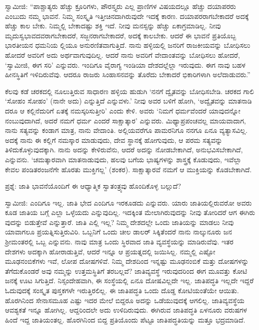 ಸ್ವಾಮೀಜಿ: “ಪಾಶ್ಚಾತ್ಯರು ಹೆಚ್ಚು ಕ್ರೂರಿಗಳು, ಪೌರಸ್ತ್ಯರು ಎಲ್ಲ ಪ್ರಾಣಿಗಳ ವಿಷಯದಲ್ಲೂ ಹೆಚ್ಚು ದಯಾಪರರು ಎಂಬುದು ನಮ್ಮ ಭಾವನೆ. ನಿಮ್ಮ ಸಂಸ್ಕೃತಿ ಇತ್ತೀಚಿನದಾಗಿರುವುದೇ ಇದಕ್ಕೆ ಕಾರಣ. ದಯಾಪರರಾಗಬೇಕಾದರೆ ಅದಕ್ಕೆ ಹೆಚ್ಚು ಕಾಲ ಬೇಕು. ನಿಮ್ಮಲ್ಲಿ ಬೇಕಾದಷ್ಟು ಶಕ್ತಿ ಇದೆ. ನೀವು ಮನಸ್ಸನ್ನು ಹೆಚ್ಚು ಏಕಾಗ್ರಮಾಡಿಲ್ಲ. ನೀವು ಮೃದುಸ್ವಭಾವದವರಾಗಬೇಕಾದರೆ, ಸಜ್ಜನರಾಗಬೇಕಾದರೆ, ಅದಕ್ಕೆ ಕಾಲಬೇಕು. ಆದರೆ ಈ ಭಾವನೆ ಪ್ರತಿಯೊಬ್ಬ ಭಾರತೀಯನ ಧಮನಿಯ ಲ್ಲಿಯೂ ಅನುರಣಿತವಾಗುತ್ತಿದೆ. ನಾನು ಹಳ್ಳಿಯಲ್ಲಿ ಜನರಿಗೆ ರಾಜಕೀಯವನ್ನು ಬೋಧಿಸಲು ಹೋದರೆ ಅವರಿಗೆ ಅದು ಅರ್ಥವಾಗುವುದಿಲ್ಲ. ಆದರೆ ನಾನು ಅವರಿಗೆ ವೇದಾಂತವನ್ನು ಬೋಧಿಸಲು ಹೋದರೆ, ‘ಸ್ವಾಮೀಜಿ, ಈಗ ಸರಿ’ ಎನ್ನುವರು. ಇಂದಿಗೂ ವೈರಾಗ್ಯ ಇಂಡಿಯಾ ದೇಶದಲ್ಲೆಲ್ಲಾ ಇರುವುದು. ಈಗ ನಾವು ಬಹಳ ಹೀನಸ್ಥಿತಿಗೆ ಇಳಿದಿರುವೆವು. ಆದರೂ ರಾಜರು ಸಿಂಹಾಸನವನ್ನು ತೊರೆದು ಬೇಕಾದರೆ ಭಿಕಾರಿಗಳಾಗಿ ಅಲೆದಾಡುವರು.”

ಕೆಲವು ಕಡೆ ಚರಕದಲ್ಲಿ ನೂಲುತ್ತಿರುವ ಸಾಧಾರಣ ಹಳ್ಳಿಯ ಹುಡುಗಿ ‘ನನಗೆ ದ್ವೈತವನ್ನು ಬೋಧಿಸಬೇಡಿ. ಚರಕದ ಗಾಲಿ ‘ಸೋಹಂ ಸೋಹಂ’ (ನಾನೇ ಅದು) ಎನ್ನುತ್ತಿದೆ ಎನ್ನುವಳು.’ ನೀವು ಅವರ ಬಳಿಗೆ ಹೋಗಿ, ‘ಅದ್ವೈತವನ್ನು ಮಾತನಾಡಿ ದರೂ ಆ ಕಲ್ಲಿನೆದುರಿಗೆ ಏತಕ್ಕೆ ನಮಸ್ಕರಿಸುತ್ತೀರಿ’ ಎಂದು ಕೇಳಿ. ಅವರು ‘ನಿಮಗೆ ಧರ್ಮವೆಂದರೆ ಯಾವುದನ್ನೋ ನಂಬುವುದಾಗಿದೆ, ಅದರೆ ನಮಗೆ ಧರ್ಮ ಎಂದರೆ ಸಾಕ್ಷಾತ್ಕಾರ’ ಎನ್ನುವರು. ಮಿಥ್ಯಾಪ್ರಪಂಚವಲ್ಲ ಮಾಯವಾದಾಗ, ನಾನು ಸತ್ಯವನ್ನು ಕಂಡಾಗ ಮಾತ್ರ, ನಾನು ವೇದಾಂತಿ. ಅಲ್ಲಿಯವರೆಗೂ ಪಾಮರನಿಗೂ ನನಗೂ ಏನೂ ವ್ಯತ್ಯಾಸವಿಲ್ಲ. ಅದಕ್ಕೆ ನಾನು ಈ ಕಲ್ಲಿಗೆ ನಮಸ್ಕಾರ ಮಾಡುವುದು, ದೇವ ಸ್ಥಾನಕ್ಕೆ ಹೋಗುವುದು, ಆ ಪರಮ ಸತ್ಯವನ್ನು ತಿಳಿದುಕೊಳ್ಳುವುದಕ್ಕಾಗಿ. ನಾನು ಅದನ್ನು ಕೇಳಿರುವೆನು, ಆದರೆ ಅದನ್ನು ನೋಡಬೇಕಾಗಿದೆ, ಅನುಭವಿಸಬೇಕಾಗಿದೆ, ಎನ್ನುವನು. ‘ಚಮತ್ಕಾರವಾಗಿ ಮಾತನಾಡುವುದು, ಹಲವು ಬಗೆಯ ಭಾಷ್ಯಗಳನ್ನು ಶಾಸ್ತ್ರಕ್ಕೆ ಕೊಡುವುದು, ಇವೆಲ್ಲಾ ಕೇವಲ ಪಂಡಿತರಂಜನೆಗೇ ಹೊರತು ಮುಕ್ತಿಗಲ್ಲ’ (ಶಂಕರ). ಸಾಕ್ಷಾತ್ಕಾರವೆ ನಮಗೆ ಆ ಮುಕ್ತಿಯನ್ನು ಕೊಡಬೇಕಾಗಿದೆ.

ಪ್ರಶ್ನೆ: ಜಾತಿ ಭಾವನೆಯೊಂದಿಗೆ ಈ ಆಧ್ಯಾತ್ಮಿಕ ಸ್ವಾತಂತ್ರ್ಯವು ಹೊಂದಿಕೊಳ್ಳ ಬಲ್ಲುದೆ?

ಸ್ವಾಮೀಜಿ: ಎಂದಿಗೂ ಇಲ್ಲ. ಜಾತಿ ಭೇದ ಎಂದಿಗೂ ಇರಕೂಡದು ಎನ್ನುವರು. ಯಾರು ಜಾತಿಯಲ್ಲಿರುವರೋ ಅವರು ಕೂಡ ಜಾತಿಯ ಬಗ್ಗೆ ಎಲ್ಲಾ ಒಳ್ಳೆಯದು ಎನ್ನುವುದಿಲ್ಲ. ಇದಕ್ಕಿಂತ ಮೇಲಾಗಿರುವುದನ್ನು ನೀವು ತೋರಿದರೆ ಆಗ ಈಗಿರು ವುದನ್ನು ಬಿಡುತ್ತೇವೆ ಎನ್ನುತ್ತಾರೆ. ಜಾತಿ ಎಲ್ಲಿ ಇಲ್ಲ? ನಿಮ್ಮ ದೇಶದಲ್ಲೇ ಒಂದು ಜಾತಿಯನ್ನು ಮಾಡಲು ನೀವು ಯಾವಾಗಲೂ ಪ್ರಯತ್ನಿಸುತ್ತಿರುವಿರಿ. ಒಬ್ಬನಿಗೆ ಒಂದು ಚೀಲ ಡಾಲರ್​ ಸಿಕ್ಕಿತೆಂದರೆ ನಾನು ನಾಲ್ಕುನೂರು ಜನ ಶ‍್ರೀಮಂತರಲ್ಲಿ ಒಬ್ಬ ಎನ್ನುವನು. ನಾವು ಮಾತ್ರ ಒಂದು ಸ್ಥಿರವಾದ ಜಾತಿ ವ್ಯವಸ್ಥೆಯನ್ನು ಮಾಡಿರುವೆವು. ಇತರ ದೇಶಗಳು ಅದಕ್ಕಾಗಿ ಹೋರಾಡುತ್ತಿವೆ, ಆದರೆ ಇನ್ನೂ ಆ ಪ್ರಯತ್ನದಲ್ಲಿ ಜಯಿಸಿಲ್ಲ. ನಮ್ಮಲ್ಲಿ ಎಷ್ಟೋ ಮೂಢನಂಬಿಕೆಗಳು ಇವೆ, ಲೋಪ ದೋಷಗಳಿವೆ. ನಿಮ್ಮ ದೇಶದಿಂದ ಇನ್ನಷ್ಟು ಮೂಢನಂಬಿಕೆ ಮತ್ತು ದೋಷಗಳನ್ನು ತೆಗೆದುಕೊಂಡರೆ ಅವು ನಮ್ಮನ್ನು ಉತ್ತಮಸ್ಥಿತಿಗೆ ತರಬಲ್ಲವೆ? ಜಾತಿವ್ಯವಸ್ಥೆ ಇರುವುದರಿಂದ ಈಗ ಮೂವತ್ತು ಕೋಟಿ ಜನಕ್ಕೆ ಊಟ ಸಿಗುತ್ತಿದೆ. ನಿಸ್ಸಂದೇಹವಾಗಿ, ಈ ಸಂಸ್ಥೆಯಲ್ಲಿ ಏನೂ ದೋಷವಿಲ್ಲದೇ ಇಲ್ಲ. ಜಾತಿಪದ್ಧತಿ ಇಲ್ಲದೇ ಇದ್ದರೆ ಓದುವುದಕ್ಕೆ ಸಂಸ್ಕೃತ ಪುಸ್ತಕಗಳೇ ಇರುತ್ತಿರಲಿಲ್ಲ. ಈ ಜಾತಿಪದ್ಧತಿ ಒಂದು ದೊಡ್ಡ ಕೋಟಿಯಂತೆಯೇ ಆಯಿತು. ಹೊರಗಿನಿಂದ ಸೇನಾಸಮೂಹ ಎಷ್ಟು ಇದರ ಮೇಲೆ ಬಿದ್ದರೂ ಅದನ್ನು ಒಡೆಯುವುದಕ್ಕೆ ಆಗಲಿಲ್ಲ. ಜಾತಿವ್ಯವಸ್ಥೆಯ ಆವಶ್ಯಕತೆ ಇನ್ನೂ ಹೋಗಿಲ್ಲ. ಆದ್ದರಿಂದಲೇ ಅದು ಉಳಿದಿರುವುದು. ಈಗಿರುವ ಜಾತಿಪದ್ಧತಿ ಏಳನೂರು ವರುಷಗಳ ಹಿಂದೆ ಇದ್ದ ಜಾತಿಯಂತಲ್ಲ. ಹೊರಗಿನಿಂದ ಬಿದ್ದ ಪ್ರತಿಯೊಂದು ಪೆಟ್ಟೂ ಜಾತಿಪದ್ಧತಿಯನ್ನು ಮತ್ತೂ ಭದ್ರಮಾಡಿದೆ.

